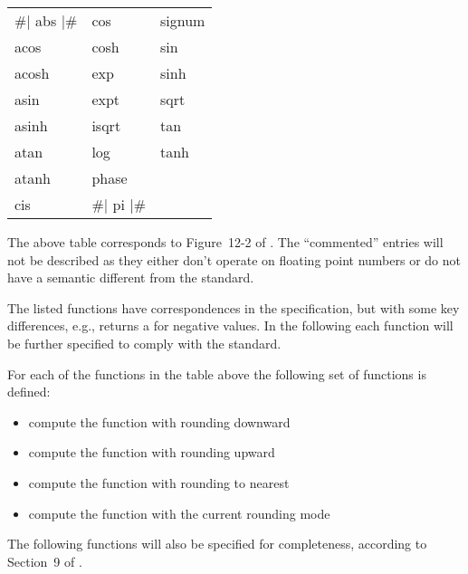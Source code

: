 \documentclass[../../Operations.tex]{subfiles}
\begin{document}
\label{sect:transc-ops}

\begin{tt}
  \begin{tabular}{lll}
    \#| abs |\# & cos & signum\\
    acos &  cosh &  sin\\
    acosh & exp  &  sinh\\
    asin &  expt &  sqrt\\
    asinh & isqrt &  tan\\
    atan &  log &   tanh\\
    atanh & phase & \\
    cis & \#| pi |\# & \\
  \end{tabular}
\end{tt}

\vspace*{3mm}

\noindent
The above table corresponds to Figure~12-2 of \cite{1996:ANSIHyperSpec}.
The ``commented'' entries will not be described as they either don't
operate on floating point numbers or do not have a semantic different
from the \CL{} standard.

\noindent
The listed \CL{} functions have correspondences in the \cite{2008:IEEE-754}
specification, but with some key differences, e.g.,  returns
a  for negative values.  In the following each
function will be further specified to comply with the \cite{2008:IEEE-754}
standard.


\noindent
For each of the functions in the table above the following set of functions is
defined:
\begin{itemize}
  \item {} compute the function with rounding downward
  \item {} compute the function with rounding upward
  \item {} compute the function with rounding to nearest
  \item {} compute the function with the current rounding mode
\end{itemize}
\vspace*{3mm}

The following functions will also be specified for completeness,
according to Section~9 of \cite{2008:IEEE-754}.









\end{document}

